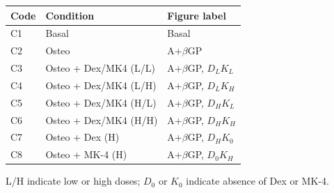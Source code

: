 \documentclass[11pt,a4paper]{article}
\begin{document}
\begin{table}[htbp]
\centering
\renewcommand{\arraystretch}{1.1}
\setlength{\tabcolsep}{8pt}
\begin{tabular}{@{}l l l@{}}
\toprule
\textbf{Code} & \textbf{Condition} & \textbf{Figure label} \\
\midrule
C1 & Basal & Basal \\
C2 & Osteo & A+$\beta$GP \\
C3 & Osteo + Dex/MK4 (L/L) & A+$\beta$GP, $D_LK_L$ \\
C4 & Osteo + Dex/MK4 (L/H) & A+$\beta$GP, $D_LK_H$ \\
C5 & Osteo + Dex/MK4 (H/L) & A+$\beta$GP, $D_HK_L$ \\
C6 & Osteo + Dex/MK4 (H/H) & A+$\beta$GP, $D_HK_H$ \\
C7 & Osteo + Dex (H) & A+$\beta$GP, $D_HK_0$ \\
C8 & Osteo + MK-4 (H) & A+$\beta$GP, $D_0K_H$ \\
\bottomrule
\end{tabular}
\end{table}

\noindent
L/H indicate low or high doses; $D_0$ or $K_0$ indicate absence of Dex or MK-4.
\end{document}
